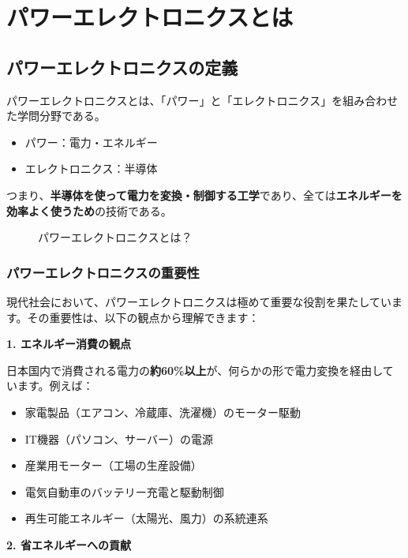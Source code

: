 \section{パワーエレクトロニクスとは}

\subsection{パワーエレクトロニクスの定義}

パワーエレクトロニクスとは、「パワー」と「エレクトロニクス」を組み合わせた学問分野である。

\begin{itemize}
\item パワー：電力・エネルギー
\item エレクトロニクス：半導体
\end{itemize}

つまり、\textbf{半導体を使って電力を変換・制御する工学}であり、全ては\textbf{エネルギーを効率よく使うため}の技術である。

\begin{figure}[H]
\centering
{}
\caption{パワーエレクトロニクスとは？}
\label{fig:what_is_pe}
\end{figure}

\subsubsection{パワーエレクトロニクスの重要性}

現代社会において、パワーエレクトロニクスは極めて重要な役割を果たしています。その重要性は、以下の観点から理解できます：

\textbf{1. エネルギー消費の観点}

日本国内で消費される電力の\textbf{約60\%以上}が、何らかの形で電力変換を経由しています。例えば：

\begin{itemize}
\item 家電製品（エアコン、冷蔵庫、洗濯機）のモーター駆動
\item IT機器（パソコン、サーバー）の電源
\item 産業用モーター（工場の生産設備）
\item 電気自動車のバッテリー充電と駆動制御
\item 再生可能エネルギー（太陽光、風力）の系統連系
\end{itemize}

\textbf{2. 省エネルギーへの貢献}

